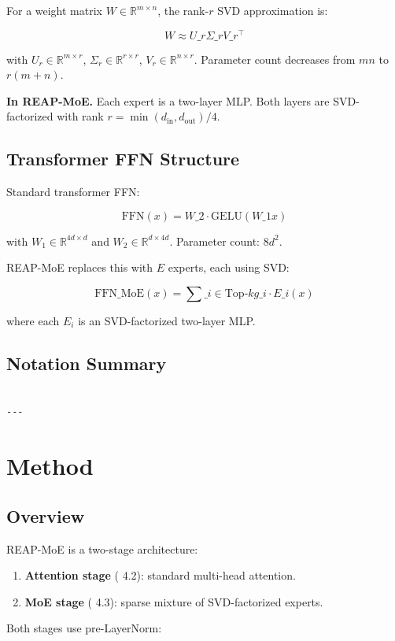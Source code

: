 For a weight matrix $W \in \mathbb{R}^{m \times n}$, the rank-$r$ SVD 
approximation is:

\[
W \approx U\_r \Sigma\_r V\_r^\top
\tag{3.6}
\]

with $U_r \in \mathbb{R}^{m \times r}$, $\Sigma_r \in \mathbb{R}^{r \times r}$, 
$V_r \in \mathbb{R}^{n \times r}$. Parameter count decreases from $mn$ to 
$r(m + n)$.

\textbf{In REAP-MoE.} Each expert is a two-layer MLP. Both layers are SVD-factorized 
with rank $r = \min(d_\text{in}, d_\text{out}) / 4$.

\subsection{Transformer FFN Structure}

Standard transformer FFN:

\[
\text{FFN}(x) = W\_2 \cdot \text{GELU}(W\_1 x)
\tag{3.7}
\]

with $W_1 \in \mathbb{R}^{4d \times d}$ and $W_2 \in \mathbb{R}^{d \times 4d}$. 
Parameter count: $8d^2$.

REAP-MoE replaces this with $E$ experts, each using SVD:

\[
\text{FFN}\_\text{MoE}(x) = \sum\_{i \in \text{Top-}k} g\_i \cdot E\_i(x)
\tag{3.8}
\]

where each $E_i$ is an SVD-factorized two-layer MLP.

\subsection{Notation Summary}

\begin{lstlisting}

---
\end{lstlisting}

\section{Method}

\subsection{Overview}

REAP-MoE is a two-stage architecture:

\begin{enumerate}
\item \textbf{Attention stage} ( 4.2): standard multi-head attention.
\item \textbf{MoE stage} ( 4.3): sparse mixture of SVD-factorized experts.

\end{enumerate}
Both stages use pre-LayerNorm:

